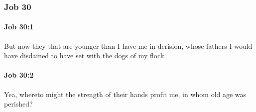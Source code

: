 	\subsubsection{Job 30} %
		\label{JOB-30}

		\paragraph{Job 30:1} %
			\label{JOB-30-1}

			But now they that are younger than I have me in derision, whose fathers I would have disdained to have set with the dogs of my flock.


		\paragraph{Job 30:2} %
			\label{JOB-30-2}

			Yea, whereto might the strength of their hands profit me, in whom old age was perished?

